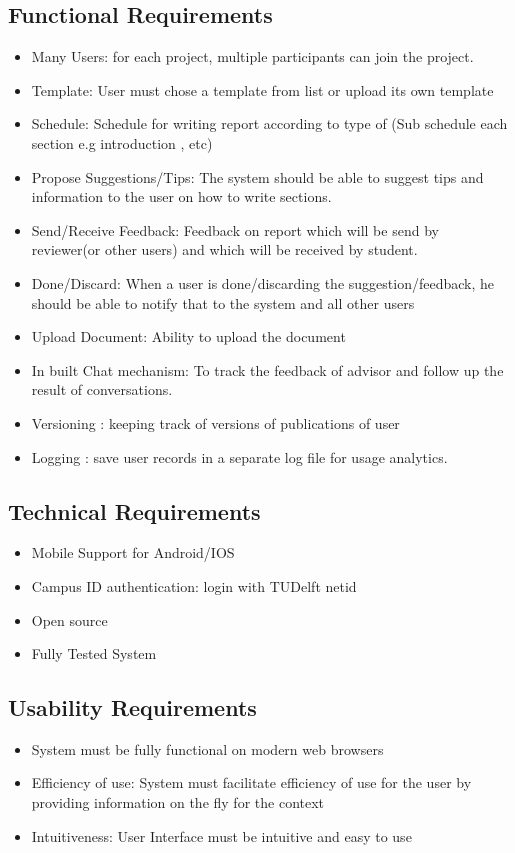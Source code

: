 \subsection{Functional Requirements} %
\label{sub:functional_requirement}
\begin{itemize}
	\item Many Users: for each project, multiple participants can join the project.
	\item Template: User must chose a template from list or upload its own template
	\item Schedule: Schedule for writing report according to type of  (Sub schedule each section e.g introduction , etc)
	\item Propose Suggestions/Tips: The system should be able to suggest tips and information to the user on how to write sections.
	\item Send/Receive Feedback: Feedback on report which will be send by reviewer(or other users) and which will be received by student.
	\item Done/Discard: When a user is done/discarding the suggestion/feedback, he should be able to notify that to the system and all other users 
	\item Upload Document: Ability to upload the document
	\item In built Chat mechanism: To track the feedback of advisor and follow up the result of conversations. 
	\item Versioning : keeping track of versions of publications of user
	\item Logging : save user records in a separate log file for usage analytics.
\end{itemize}

\subsection{Technical Requirements} %
\label{sub:technical_requirements}
\begin{itemize}
	\item Mobile Support for Android/IOS
	\item Campus ID authentication: login with TUDelft netid
	\item Open source
 	\item Fully Tested System 
	 
\end{itemize}


\subsection{Usability Requirements} %
\label{sub:usability_requirements}
\begin{itemize}
	\item System must be fully functional on modern web browsers
	\item Efficiency of use: System must facilitate efficiency of use for the user by providing information on the fly for the context
	\item Intuitiveness: User Interface must be intuitive and easy to use
\end{itemize}
